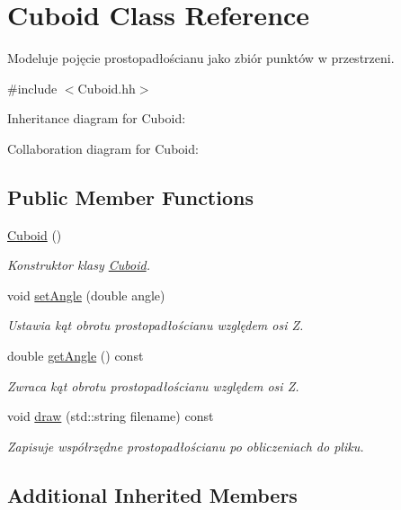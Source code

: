 \hypertarget{class_cuboid}{}\section{Cuboid Class Reference}
\label{class_cuboid}


Modeluje pojęcie prostopadłościanu jako zbiór punktów w przestrzeni.  




{\ttfamily \#include $<$Cuboid.\+hh$>$}



Inheritance diagram for Cuboid\+:


Collaboration diagram for Cuboid\+:
\subsection*{Public Member Functions}
\begin{DoxyCompactItemize}
\item 
\hyperlink{class_cuboid_a1abf60e93d024b7a01ee5b1a48f1f08a}{Cuboid} ()
\begin{DoxyCompactList}\small\item\em Konstruktor klasy \hyperlink{class_cuboid}{Cuboid}. \end{DoxyCompactList}\item 
void \hyperlink{class_cuboid_a22093add11b2e04a5bb84eaa773bcadf}{set\+Angle} (double angle)
\begin{DoxyCompactList}\small\item\em Ustawia kąt obrotu prostopadłościanu względem osi Z. \end{DoxyCompactList}\item 
double \hyperlink{class_cuboid_a1996331a8a2eaa699e11e5acf62bd79f}{get\+Angle} () const
\begin{DoxyCompactList}\small\item\em Zwraca kąt obrotu prostopadłościanu względem osi Z. \end{DoxyCompactList}\item 
void \hyperlink{class_cuboid_a0668739d601192eee110f4e50a1ddd13}{draw} (std\+::string filename) const
\begin{DoxyCompactList}\small\item\em Zapisuje współrzędne prostopadłościanu po obliczeniach do pliku. \end{DoxyCompactList}\end{DoxyCompactItemize}
\subsection*{Additional Inherited Members}


